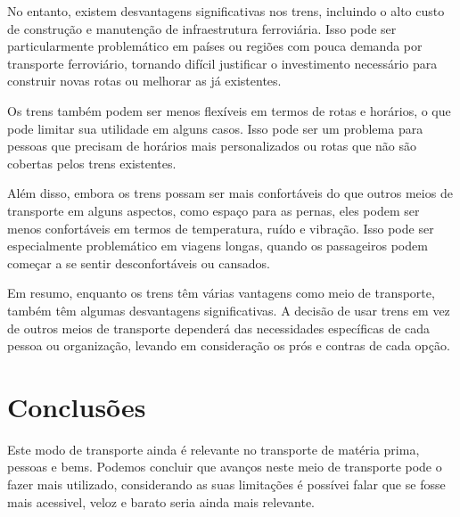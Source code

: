 \documentclass{report}
\begin{document}
No entanto, existem desvantagens significativas nos trens, incluindo o alto custo de construção e manutenção de infraestrutura ferroviária. Isso pode ser particularmente problemático em países ou regiões com pouca demanda por transporte ferroviário, tornando difícil justificar o investimento necessário para construir novas rotas ou melhorar as já existentes.

Os trens também podem ser menos flexíveis em termos de rotas e horários, o que pode limitar sua utilidade em alguns casos. Isso pode ser um problema para pessoas que precisam de horários mais personalizados ou rotas que não são cobertas pelos trens existentes.

Além disso, embora os trens possam ser mais confortáveis do que outros meios de transporte em alguns aspectos, como espaço para as pernas, eles podem ser menos confortáveis em termos de temperatura, ruído e vibração. Isso pode ser especialmente problemático em viagens longas, quando os passageiros podem começar a se sentir desconfortáveis ou cansados.

Em resumo, enquanto os trens têm várias vantagens como meio de transporte, também têm algumas desvantagens significativas. A decisão de usar trens em vez de outros meios de transporte dependerá das necessidades específicas de cada pessoa ou organização, levando em consideração os prós e contras de cada opção.
\newpage
\section{Conclus\~oes}
Este modo de transporte ainda \'e relevante no transporte de mat\'eria prima, pessoas e bems. Podemos concluir que avan\c cos neste meio de transporte pode o fazer mais utilizado, considerando as suas limita\c c\~oes \'e possívei falar que se fosse mais acessivel, veloz e barato seria ainda mais relevante.
\begin{abstract}
O artigo discute a história e os avanços no transporte ferroviário. O transporte ferroviário envolve a transferência de mercadorias ou pessoas usando trens, automóveis ou modos de transporte similares. Desde o final do século 19, houve avanços significativos na tecnologia de trens, incluindo a substituição de motores a vapor por motores elétricos e diesel, que ofereciam vantagens em velocidade, eficiência e manutenção. Os trens elétricos de alta velocidade foram desenvolvidos no início do século 20, permitindo que os trens viajassem em velocidades nunca antes possíveis. Estes comboios tornaram as viagens de longa distância mais rápidas e convenientes. 
Os trens modernos também são mais confortáveis e silenciosos do que seus antecessores, oferecendo comodidades como ar condicionado e sistemas de entretenimento. No entanto, o transporte ferroviário ainda enfrenta desafios significativos, incluindo o alto custo de construção e manutenção de infraestrutura e rotas e horários limitados. Apesar destes desafios, a tecnologia ferroviária continua a evoluir, com sistemas avançados de segurança e controlo de velocidade, tornando o transporte ferroviário um meio de transporte confortável e conveniente para muitas pessoas.
\end{abstract}
\end{document}

